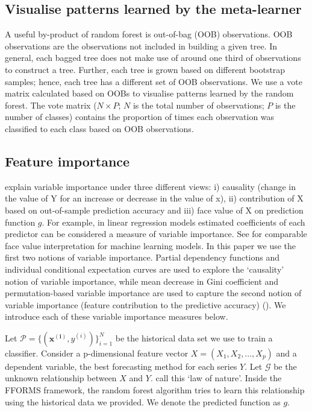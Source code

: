 \documentclass[11pt,a4paper,]{article}
\begin{document}
\hypertarget{visualise-patterns-learned-by-the-meta-learner}{%
\subsection{Visualise patterns learned by the meta-learner}\label{visualise-patterns-learned-by-the-meta-learner}}

A useful by-product of random forest is out-of-bag (OOB) observations. OOB observations are the observations not included in building a given tree. In general, each bagged tree does not make use of around one third of observations to construct a tree. Further, each tree is grown based on different bootstrap samples; hence, each tree has a different set of OOB observations. We use a vote matrix calculated based on OOBs to visualise patterns learned by the random forest. The vote matrix (\(N \times P\); \(N\) is the total number of observations; \(P\) is the number of classes) contains the proportion of times each observation was classified to each class based on OOB observations.

\hypertarget{feature-importance}{%
\subsection{Feature importance}\label{feature-importance}}

\textcite{jiang2002} explain variable importance under three different views: i) causality (change in the value of Y for an increase or decrease in the value of x), ii) contribution of X based on out-of-sample prediction accuracy and iii) face value of X on prediction function \(g\). For example, in linear regression models estimated coefficients of each predictor can be considered a measure of variable importance. See \textcite{jiang2002} for comparable face value interpretation for machine learning models. In this paper we use the first two notions of variable importance. Partial dependency functions and individual conditional expectation curves are used to explore the `causality' notion of variable importance, while mean decrease in Gini coefficient and permutation-based variable importance are used to capture the second notion of variable importance (feature contribution to the predictive accuracy) (\textcite{Zhao}). We introduce each of these variable importance measures below.

Let \(\mathcal{P}=\{(\mathbf{x^{(i)}}, y^{(i)})\}_{i=1}^{N}\) be the
historical data set we use to train a classifier. Consider a
p-dimensional feature vector \(X=(X_1, X_2, ..., X_p)\) and a dependent
variable, the best forecasting method for each series \(Y\). Let \(\mathcal{G}\) be the unknown relationship between \(X\) and
\(Y\). \textcite{Zhao} call this `law of nature'. Inside the FFORMS framework, the random forest algorithm tries to learn this relationship using
the historical data we provided. We denote the predicted function as
\(g\).
\end{document}
